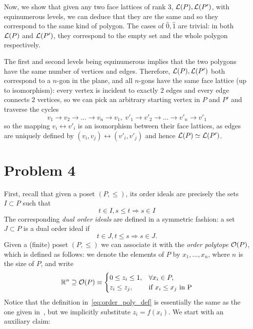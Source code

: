 \documentclass[11pt]{article}
\begin{document}
Now, we show that given any two face lattices of rank $3$, $\mathcal{L}(P), \mathcal{L}(P')$,
with equinumerous levels, we can deduce that they are the same and so they
correspond to the same kind of polygon. The cases of $\hat{0}, \hat{1}$ are
trivial: in both $\mathcal{L}(P)$ and $\mathcal{L}(P')$, they correspond to the empty set and
the whole polygon respectively.

The first and second levels being equinumerous implies that the two polygons
have the same number of vertices and edges.  Therefore, $\mathcal{L}(P), \mathcal{L}(P')$ both
correspond to a $n$-gon in the plane, and all $n$-gons have the same face
lattice (up to isomorphism): every vertex is incident to exactly $2$ edges and
every edge connects $2$ vertices, so we can pick an arbitrary starting vertex
in $P$ and $P'$ and traverse the cycles
\[
    v_1 \to v_2 \to \dots \to v_n \to v_1, \;
    v'_1 \to v'_2 \to \dots \to v'_n \to v'_1
\]
so the mapping $v_i \leftrightarrow v'_i$ is an isomorphism between their face
lattices, as edges are uniquely defined by $(v_i, v_j) \leftrightarrow (v'_i,
v'_j)$ and hence $\mathcal{L}(P) \simeq \mathcal{L}(P')$.

\section*{Problem 4}
First, recall that given a poset $(P, \leq)$, its order ideals are precisely
the sets $I \subset P$ such that
\[
    t \in I, s \leq t \Rightarrow s \in I
\]
The corresponding \textit{dual order ideals} are defined in a symmetric fashion:
a set $J \subset P$ is a dual order ideal if
\[
    t \in J, t \leq s \Rightarrow s \in J.
\]
Given a (finite) poset $(P, \leq)$ we can associate it with the \textit{order
polytope} $\mathcal{O}(P)$, which is defined as follows: we denote the elements of $P$
by $x_1, \dots, x_n$, where $n$ is the size of $P$, and write
\begin{equation}
    \mathbb{R}^n \supseteq \mathcal{O}(P) \equiv \begin{cases}
        0 \leq z_i \leq 1, & \forall x_i \in P, \\
        z_i \leq z_j, & \text{if } x_i \leq x_j \text{ in P}
    \end{cases}
    \label{eq:order_poly_def}
\end{equation}
Notice that the definition in~\cref{eq:order_poly_def} is essentially the same
as the one given in~\cite{Stan86}, but we implicitly substitute $z_i = f(x_i)$.
We start with an auxiliary claim:
\end{document}
